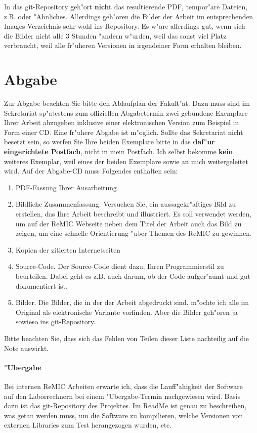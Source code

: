 \documentclass[12pt,a4paper,headinclude,twoside, plainheadsepline, open=right,numbers=noenddot]{scrreprt}
\begin{document}
In das git-Repository geh"ort \textbf{nicht} das resultierende PDF, tempor"are Dateien, z.B.  oder "Ahnliches.
Allerdings geh"oren die Bilder der Arbeit im entsprechenden Images-Verzeichnis sehr wohl ins Repository.
Es w"are allerdings gut, wenn sich die Bilder nicht alle 3 Stunden "andern w"urden, weil das sonst viel Platz verbraucht, weil alle fr"uheren Versionen in irgendeiner Form erhalten bleiben.

\section{Abgabe}
\label{abgabe}

Zur Abgabe beachten Sie bitte den Ablaufplan der Fakult"at.
Dazu muss sind im Sekretariat sp"atestens zum offiziellen Abgabetermin zwei gebundene Exemplare Ihrer Arbeit abzugeben inklusive einer elektronischen Version zum Beispiel in Form einer CD.
Eine fr"uhere Abgabe ist m"oglich.
Sollte das Sekretariat nicht besetzt sein, so werfen Sie Ihre beiden Exemplare bitte in das \textbf{daf"ur eingerichtete Postfach}, nicht in mein Postfach.
Ich selbst bekomme \textbf{kein} weiteres Exemplar, weil eines der beiden Exemplare sowie an mich weitergeleitet wird.
Auf der Abgabe-CD muss Folgendes enthalten sein:
\begin{enumerate}
\item PDF-Fassung Ihrer Ausarbeitung
\item Bildliche Zusammenfassung. Versuchen Sie, ein aussagekr"aftiges Bild zu erstellen, das Ihre Arbeit beschreibt und illustriert.
Es soll verwendet werden, um auf der ReMIC Webseite neben dem Titel der Arbeit auch das Bild zu zeigen, um eine schnelle Orientierung "uber Themen des ReMIC zu gewinnen.
\item Kopien der zitierten Internetseiten
\item Source-Code. Der Source-Code dient dazu, Ihren Programmierstil zu beurteilen. Dabei geht es z.B. auch darum, ob der Code aufger"aumt und gut dokumentiert ist.
\item Bilder. Die Bilder, die in der der Arbeit abgedruckt sind, m"ochte ich alle im Original als elektronische Variante vorfinden.
Aber die Bilder geh"oren ja sowieso ins git-Repository.
\end{enumerate}
Bitte beachten Sie, dass sich das Fehlen von Teilen dieser Liste nachteilig auf die Note auswirkt.

\paragraph{"Ubergabe} Bei internen ReMIC Arbeiten erwarte ich, dass die Lauff"ahigkeit der Software auf den Laborrechnern bei einem "Ubergabe-Termin nachgewiesen wird.
Basis dazu ist das git-Repository des Projektes.
Im ReadMe ist  genau zu beschreiben, was getan werden muss, um die Software zu kompilieren, welche Versionen von externen Libraries zum Test herangezogen wurden, etc.
\end{document}
